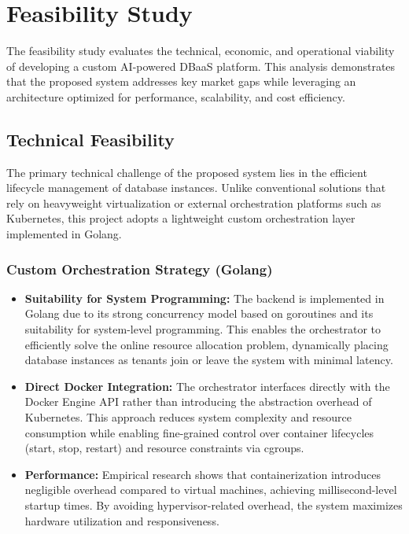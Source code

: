 \section{Feasibility Study}

The feasibility study evaluates the technical, economic, and operational viability of developing a custom AI-powered DBaaS platform. This analysis demonstrates that the proposed system addresses key market gaps while leveraging an architecture optimized for performance, scalability, and cost efficiency.

\subsection{Technical Feasibility}

The primary technical challenge of the proposed system lies in the efficient lifecycle management of database instances. Unlike conventional solutions that rely on heavyweight virtualization or external orchestration platforms such as Kubernetes, this project adopts a lightweight custom orchestration layer implemented in Golang.

\subsubsection*{Custom Orchestration Strategy (Golang)}
\begin{itemize}
    \item \textbf{Suitability for System Programming:} The backend is implemented in Golang due to its strong concurrency model based on goroutines and its suitability for system-level programming. This enables the orchestrator to efficiently solve the online resource allocation problem, dynamically placing database instances as tenants join or leave the system with minimal latency.
    \item \textbf{Direct Docker Integration:} The orchestrator interfaces directly with the Docker Engine API rather than introducing the abstraction overhead of Kubernetes. This approach reduces system complexity and resource consumption while enabling fine-grained control over container lifecycles (start, stop, restart) and resource constraints via cgroups.
    \item \textbf{Performance:} Empirical research shows that containerization introduces negligible overhead compared to virtual machines, achieving millisecond-level startup times. By avoiding hypervisor-related overhead, the system maximizes hardware utilization and responsiveness.
\end{itemize}

